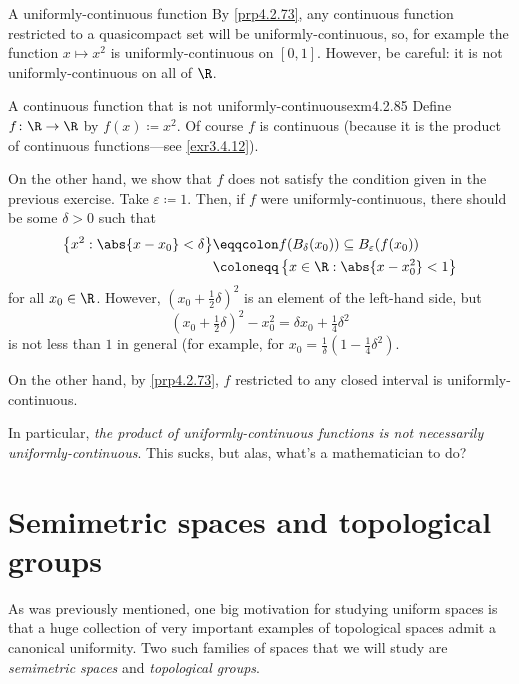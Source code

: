 \begin{exm}{A uniformly-continuous function}{}
By \cref{prp4.2.73}, any continuous function restricted to a quasicompact set will be uniformly-continuous, so, for example the function $x\mapsto x^2$ is uniformly-continuous on $[0,1]$.  However, be careful:  it is not uniformly-continuous on all of $\R$.
\end{exm}
\begin{exm}{A continuous function that is not uniformly-continuous}{exm4.2.85}
Define $f\colon \R \rightarrow \R$ by $f(x)\coloneqq x^2$.  Of course $f$ is continuous (because it is the product of continuous functions---see \cref{exr3.4.12}).

On the other hand, we show that $f$ does not satisfy the condition given in the previous exercise.  Take $\varepsilon \coloneqq 1$.  Then, if $f$ were uniformly-continuous, there should be some $\delta >0$ such that
\begin{equation}
\begin{split}
\left\{ x^2:\abs{x-x_0}<\delta \right\} & \eqqcolon f(B_\delta (x_0))\subseteq B_{\varepsilon}(f(x_0))\\
& \coloneqq \left\{ x\in \R :\abs{x-x_0^2}<1\right\}
\end{split} 
\end{equation}
for all $x_0\in \R$.  However, $(x_0+\frac{1}{2}\delta )^2$ is an element of the left-hand side, but
\begin{equation}
\left( x_0+\tfrac{1}{2}\delta \right) ^2-x_0^2=\delta x_0+\tfrac{1}{4}\delta ^2
\end{equation}
is not less than $1$ in general (for example, for $x_0=\frac{1}{\delta}(1-\tfrac{1}{4}\delta ^2)$.

On the other hand, by \cref{prp4.2.73}, $f$ restricted to any closed interval is uniformly-continuous.
\begin{rmk}
In particular, \emph{the product of uniformly-continuous functions is not necessarily uniformly-continuous}.  This sucks, but alas, what's a mathematician to do?
\end{rmk}
\end{exm}

\section{Semimetric spaces and topological groups}

As was previously mentioned, one big motivation for studying uniform spaces is that a huge collection of very important examples of topological spaces admit a canonical uniformity.  Two such families of spaces that we will study are \emph{semimetric spaces} and \emph{topological groups}.

